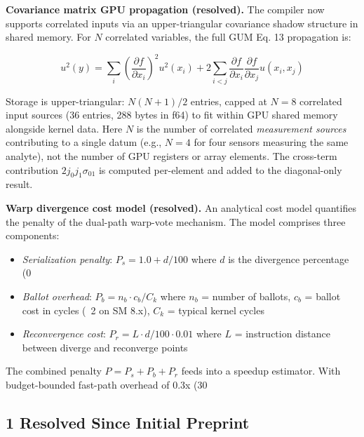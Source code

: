 \documentclass[11pt]{article}
\begin{document}
{{\textbf{Covariance matrix GPU propagation (resolved).} The compiler now supports correlated inputs via an upper-triangular covariance shadow structure in shared memory. For $N$ correlated variables, the full GUM Eq. 13 propagation is:

\[u^2(y) = \sum_i \left(\frac{\partial f}{\partial x_i}\right)^2 u^2(x_i) + 2 \sum_{i < j} \frac{\partial f}{\partial x_i} \frac{\partial f}{\partial x_j} u(x_i, x_j)\]

Storage is upper-triangular: $N(N+1)/2$ entries, capped at $N = 8$ correlated input sources (36 entries, 288 bytes in f64) to fit within GPU shared memory alongside kernel data. Here $N$ is the number of correlated \emph{measurement sources} contributing to a single datum (e.g., $N = 4$ for four sensors measuring the same analyte), not the number of GPU registers or array elements. The cross-term contribution $2 j_0 j_1 \sigma_{01}$ is computed per-element and added to the diagonal-only result.

\textbf{Warp divergence cost model (resolved).} An analytical cost model quantifies the penalty of the dual-path warp-vote mechanism. The model comprises three components:

\begin{itemize}
\item \emph{Serialization penalty}: $P_s = 1.0 + d/100$ where $d$ is the divergence percentage (0%
\item \emph{Ballot overhead}: $P_b = n_b \cdot c_b / C_k$ where $n_b$ = number of ballots, $c_b$ = ballot cost in cycles (~2 on SM 8.x), $C_k$ = typical kernel cycles
\item \emph{Reconvergence cost}: $P_r = L \cdot d/100 \cdot 0.01$ where $L$ = instruction distance between diverge and reconverge points
\end{itemize}

The combined penalty $P = P_s + P_b + P_r$ feeds into a speedup estimator. With budget-bounded fast-path overhead of 0.3x (30%

\subsection{1 Resolved Since Initial Preprint}

}}
\end{document}
